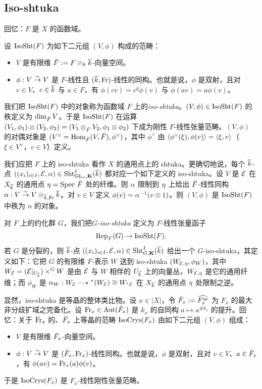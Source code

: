 
\subsection{Iso-shtuka}

回忆：$F$ 是 $X$ 的函数域。

设 $\mathrm{IsoSht}(F)$ 为如下二元组 $(V, \phi)$ 构成的范畴：
\begin{itemize}
\item $V$ 是有限维 $\breve F:=F\otimes_{k} \overline k$-向量空间。
\item $\phi: V\stackrel{\sim}{\to} V$ 是 $F$-线性且 $(\overline k, \textup{Fr})$-线性的同构。也就是说，$\phi$ 是双射，且对 $v\in V$、$c\in \overline k$ 与 $a\in F$，有
$\phi(cv)=c^{q}\phi(v)$ 与 $\phi(av)=a\phi(v)$。
\end{itemize}
我们把 $\mathrm{IsoSht}(F)$ 中的对象称为函数域 $F$ 上的\emph{iso-shtuka}。$(V,\phi)\in \mathrm{IsoSht}(F)$ 的秩定义为 $\dim_{\breve F}V$。于是 $\mathrm{IsoSht}(F)$ 在运算 $(V_{1},\phi_{1})\otimes (V_{2}, \phi_{2})=(V_{1}\otimes_{\breve F} V_{2}, \phi_{1}\otimes\phi_{2})$ 下成为刚性 $F$-线性张量范畴。$(V,\phi)$ 的对偶对象是 $(V^{\vee}=\textup{Hom}_{\breve F}(V,\breve F), \phi^{\vee})$，其中 $\phi^{\vee}$ 由 $\langle{\phi^{\vee}(\xi),\phi(v)}\rangle=\langle{\xi, v}\rangle$（$\xi\in V^{\vee}$，$v\in V$）定义。

我们应把 $F$ 上的 iso-shtuka 看作 $X$ 的通用点上的 shtuka。更确切地说，每个 $\overline k$-点 $((x_{i})_{i\in I}, \mathcal{E}, \alpha)\in \textup{Sht}^{I}_{\textup{GL}_{n},\mathbf{K}}(\overline k)$ 都对应一个如下定义的 iso-shtuka。设 $V$ 是 $\mathcal{E}$ 在 $X_{\overline k}$ 的通用点 $\eta=\textup{Spec}\  \breve F$ 处的纤维。则 $\alpha$ 限制到 $\eta$ 上给出 $\breve F$-线性同构 $\alpha: V\stackrel{\sim}{\to} V\otimes_{\overline k,\textup{Fr}}\overline k$。对 $v\in V$ 定义 $\phi(v)=\alpha^{-1}(v\otimes 1)$。则 $(V,\phi)$ 是 $\mathrm{IsoSht}(F)$ 中秩为 $n$ 的对象。

对 $F$ 上的约化群 $G$，我们把\emph{$G$-iso-shtuka} 定义为 $F$-线性张量函子
\begin{equation}\label{GisoSh}
\textup{Rep}_{F}(G)\to \mathrm{IsoSht}(F).
\end{equation}
若 $G$ 是分裂的，则 $\overline k$-点 $((x_{i})_{i\in I}, \mathcal{E}, \alpha)\in \textup{Sht}^{I}_{G,\mathbf{K}}(\overline k)$ 给出一个 $G$-iso-shtuka，其定义如下：它把 $G$ 的有限维 $F$-表示 $W$ 送到 iso-shtuka $(W_{\mathcal{E},\eta}, \phi_{W})$，其中 $W_{\mathcal{E}}=(\mathcal{E}|_{U_{\overline k}})\times^{G}W$ 是由 $\mathcal{E}$ 与 $W$ 相伴的 $U_{\overline k}$ 上的向量丛，$W_{\mathcal{E},\eta}$ 是它的通用纤维；而 $\phi_{W}$ 是 $\alpha_{W}: W_{\mathcal{E}}\dashrightarrow {}^{\tau}(W_{\mathcal{E}})\cong W_{{}^{\tau}\mathcal{E}}$ 在 $X_{\overline k}$ 的通用点 $\eta$ 处限制之逆。

显然，iso-shtuka 是等晶的整体类比物。设 $x\in |X|$，令 $\breve F_{x}:=\widehat{F_{x}^{\textup{ur}}}$ 为 $F_{x}$ 的最大非分歧扩域之完备化。设 $\textup{Fr}_{x}\in\textup{Aut}(\breve F_{x})$ 是 $k_{x}$ 的自同构 $a\mapsto a^{\# k_{x}}$ 的提升。回忆：关于 $\textup{Fr}_{x}$ 的、$\breve F_{x}$ 上等晶的范畴 $\mathrm{IsoCrys}(F_{x})$ 由如下二元组 $(V, \phi)$ 组成：
\begin{itemize}
\item $V$ 是有限维 $\breve F_{x}$-向量空间。
\item $\phi: V\stackrel{\sim}{\to} V$ 是 $(\breve F_{x}, \textup{Fr}_{x})$-线性同构。也就是说，$\phi$ 是双射，且对 $v\in V$、$a\in \breve F_{x}$，有
$\phi(av)=\textup{Fr}_{x}(a)\phi(v)$。
\end{itemize}
于是 $\mathrm{IsoCrys}(F_{x})$ 是 $F_{x}$-线性刚性张量范畴。

